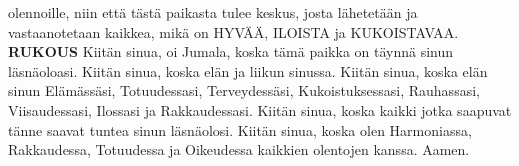 {\begin{songs}{}
        olennoille, niin että tästä paikasta tulee keskus,
        josta lähetetään ja vastaanotetaan kaikkea, mikä on
        HYVÄÄ, ILOISTA ja KUKOISTAVAA.
        \parspace
        \textbf{RUKOUS}
        \parspace
        Kiitän sinua, oi Jumala, koska tämä paikka on täynnä
        sinun läsnäoloasi.
        \parspace
        Kiitän sinua, koska elän ja liikun sinussa.
        \parspace
        Kiitän sinua, koska elän sinun Elämässäsi, Totuudessasi,
        Terveydessäsi, Kukoistuksessasi, Rauhassasi,
        Viisaudessasi, Ilossasi ja Rakkaudessasi.
        \parspace
        Kiitän sinua, koska kaikki jotka saapuvat tänne saavat
        tuntea sinun läsnäolosi.
        \parspace
        Kiitän sinua, koska olen Harmoniassa, Rakkaudessa,
        Totuudessa ja Oikeudessa kaikkien olentojen kanssa.
        \parspace
        Aamen.
      \endverse
    \endsong


    \begin{intersong}
    \end{intersong}


  \end{songs}



  \scleardpage
  \setcounter{songnum}{1}

  \begin{songs}{}



\end{songs}}
